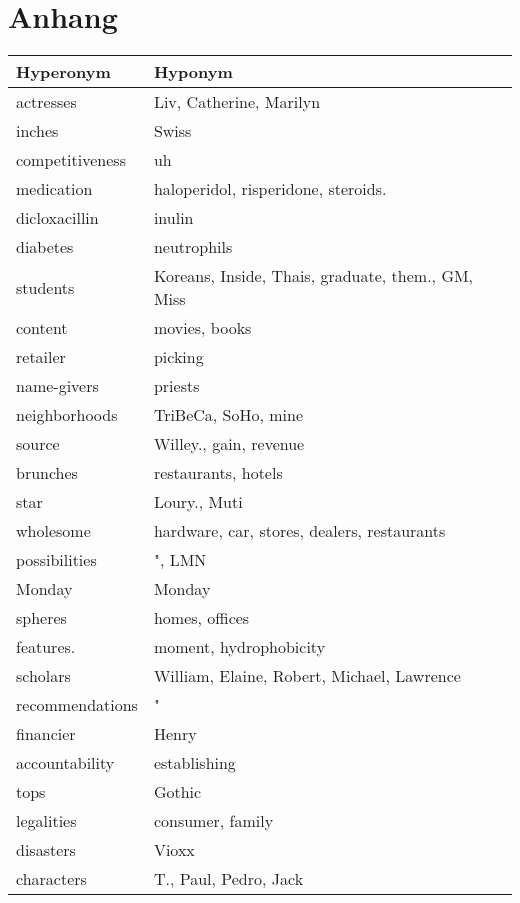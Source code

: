 \section{Anhang}

\begin{longtable}{|l|p{11cm}|}
  \hline
  \textbf{Hyperonym} & \textbf{Hyponym} \\
  \hline
  actresses & Liv, Catherine, Marilyn \\
  \hline
  inches & Swiss \\
  \hline
  competitiveness & uh \\
  \hline
  medication & haloperidol, risperidone, steroids. \\
  \hline
  dicloxacillin & inulin \\
  \hline
  diabetes & neutrophils \\
  \hline
  students & Koreans, Inside, Thais, graduate, them., GM, Miss \\
  \hline
  content & movies, books \\
  \hline
  retailer & picking \\
  \hline
  name-givers & priests \\
  \hline
  neighborhoods & TriBeCa, SoHo, mine \\
  \hline
  source & Willey., gain, revenue \\
  \hline
  brunches & restaurants, hotels \\
  \hline
  star & Loury., Muti \\
  \hline
  wholesome & hardware, car, stores, dealers, restaurants \\
  \hline
  possibilities & ", LMN \\
  \hline
  Monday & Monday \\
  \hline
  spheres & homes, offices \\
  \hline
  features. & moment, hydrophobicity \\
  \hline
  scholars & William, Elaine, Robert, Michael, Lawrence \\
  \hline
  recommendations & " \\
  \hline
  financier & Henry \\
  \hline
  accountability & establishing \\
  \hline
  tops & Gothic \\
  \hline
  legalities & consumer, family \\
  \hline
  disasters & Vioxx \\
  \hline
  characters & T., Paul, Pedro, Jack \\

\end{longtable}
